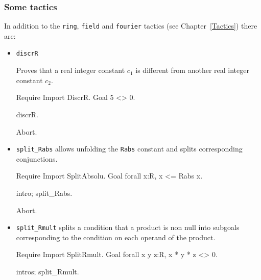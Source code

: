 \subsubsection{Some tactics}

In addition to the \verb|ring|, \verb|field| and \verb|fourier|
tactics (see Chapter~\ref{Tactics}) there are:
\begin{itemize}
\item {\tt discrR} 

  Proves that a real integer constant $c_1$ is different from another
  real integer constant $c_2$.

\begin{coq_example*}
Require Import DiscrR.
Goal 5 <> 0.
\end{coq_example*}

\begin{coq_example}
discrR.
\end{coq_example}

\begin{coq_eval}
Abort.
\end{coq_eval}

\item {\tt split\_Rabs} allows unfolding the {\tt Rabs} constant and splits
corresponding conjunctions.

\begin{coq_example*}
Require Import SplitAbsolu.
Goal forall x:R, x <= Rabs x.
\end{coq_example*}

\begin{coq_example}
intro; split_Rabs.
\end{coq_example}

\begin{coq_eval}
Abort.
\end{coq_eval}

\item {\tt split\_Rmult} splits a condition that a product is
  non null into subgoals corresponding to the condition on each
  operand of the product.

\begin{coq_example*}
Require Import SplitRmult.
Goal forall x y z:R, x * y * z <> 0.
\end{coq_example*}

\begin{coq_example}
intros; split_Rmult.
\end{coq_example}

\end{itemize}


